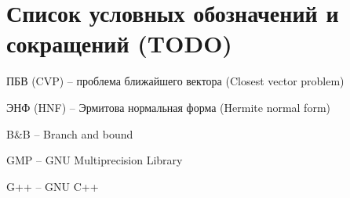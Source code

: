 \newpage

\section{Список условных обозначений и сокращений (TODO)}

ПБВ (CVP) -- проблема ближайшего вектора (Closest vector problem)

ЭНФ (HNF) -- Эрмитова нормальная форма (Hermite normal form)

B\&B -- Branch and bound

GMP -- GNU Multiprecision Library

G++ -- GNU C++


\clearpage